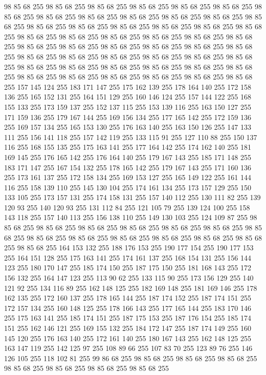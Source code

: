 98 85 68 255 98 85 68 255 98 85 68 255 98 85 68 255 98 85 68 255 98 85 68 255 98 85 68 255 98 85 68 255 98 85 68 255 98 85 68 255 98 85 68 255 98 85 68 255 98 85 68 255 98 85 68 255 98 85 68 255 98 85 68 255 98 85 68 255 98 85 68 255 98 85 68 255 98 85 68 255 98 85 68 255 98 85 68 255 98 85 68 255 98 85 68 255 98 85 68 255 98 85 68 255 98 85 68 255 98 85 68 255 98 85 68 255 98 85 68 255 98 85 68 255 98 85 68 255 98 85 68 255 98 85 68 255 98 85 68 255 98 85 68 255 98 85 68 255 98 85 68 255 98 85 68 255 98 85 68 255 98 85 68 255 98 85 68 255 98 85 68 255 98 85 68 255 98 85 68 255 98 85 68 255 98 85 68 255 98 85 68 255 98 85 68 255 157 145 124 255 183 171 147 255 175 162 139 255 178 164 140 255 172 158 136 255 165 152 131 255 164 151 129 255 160 146 124 255 157 144 122 255 168 155 133 255 173 159 137 255 152 137 115 255 153 139 116 255 163 150 127 255 171 159 136 255
179 167 144 255 169 156 134 255 177 165 142 255 172 159 136 255 169 157 134 255 165 153 130 255 176 163 140 255 163 150 126 255 147 133 111 255 156 141 118 255 157 142 119 255 133 115 91 255 127 110 88 255 150 137 116 255 168 155 135 255 175 163 141 255 177 164 142 255 174 162 140 255 181 169 145 255 176 165 142 255 176 164 140 255 179 167 143 255 185 171 148 255 183 171 147 255 167 154 132 255 178 165 142 255 179 167 143 255 171 160 136 255 173 161 137 255 172 158 134 255 169 153 127 255 165 149 122 255 161 144 116 255 158 139 110 255 145 130 104 255 174 161 134 255 173 157 129 255 150 133 105 255 173 157 131 255 174 158 131 255 157 140 112 255 130 111 82 255 139 120 93 255 140 120 93 255 131 112 84 255 121 105 79 255 139 124 100 255 158 143 118 255 157 140 113 255 156 138 110 255 149 130 103 255 124 109 87 255 98 85 68 255 98 85 68 255 98 85 68 255 98 85 68 255 98 85 68 255 98 85 68 255 98 85 68 255 98 85 68 255 98 85 68 255 98 85 68 255 98 85 68 255 98 85 68 255
98 85 68 255 98 85 68 255 164 153 132 255 188 176 153 255 190 177 154 255 190 177 153 255 164 151 128 255 175 163 141 255 174 161 137 255 168 154 131 255 156 144 123 255 180 170 147 255 185 174 150 255 187 175 150 255 181 168 143 255 172 156 132 255 164 147 123 255 113 90 62 255 133 115 90 255 173 156 129 255 140 121 92 255 134 116 89 255 162 148 125 255 182 169 148 255 181 169 146 255 178 162 135 255 172 160 137 255 178 165 144 255 187 174 152 255 187 174 151 255 172 157 134 255 160 148 125 255 178 166 143 255 177 165 144 255 183 170 146 255 175 163 141 255 185 174 151 255 187 175 153 255 187 176 154 255 185 174 151 255 162 146 121 255 169 155 132 255 184 172 147 255 187 174 149 255 160 145 120 255 176 163 140 255 172 161 140 255 180 167 143 255 162 148 125 255 163 147 119 255 142 125 97 255 108 89 66 255 107 83 70 255 123 89 76 255 146 126 105 255 118 102 81 255 99 86 68 255 98 85 68 255 98 85 68 255 98 85 68 255 98 85 68 255 98 85 68 255 98 85 68 255 98 85 68 255
